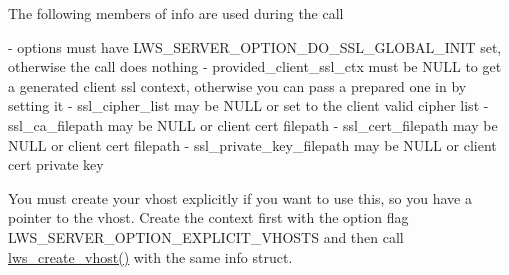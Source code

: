 The following members of info are used during the call \begin{DoxyVerb}  - options must have LWS_SERVER_OPTION_DO_SSL_GLOBAL_INIT set,
      otherwise the call does nothing
  - provided_client_ssl_ctx must be NULL to get a generated client
      ssl context, otherwise you can pass a prepared one in by setting it
  - ssl_cipher_list may be NULL or set to the client valid cipher list
  - ssl_ca_filepath may be NULL or client cert filepath
  - ssl_cert_filepath may be NULL or client cert filepath
  - ssl_private_key_filepath may be NULL or client cert private key
\end{DoxyVerb}


You must create your vhost explicitly if you want to use this, so you have a pointer to the vhost. Create the context first with the option flag L\+W\+S\+\_\+\+S\+E\+R\+V\+E\+R\+\_\+\+O\+P\+T\+I\+O\+N\+\_\+\+E\+X\+P\+L\+I\+C\+I\+T\+\_\+\+V\+H\+O\+S\+TS and then call \hyperlink{group__context-and-vhost_ga0c54c667ccd9b8b3dddcd123ca72f87c}{lws\+\_\+create\+\_\+vhost()} with the same info struct. 
